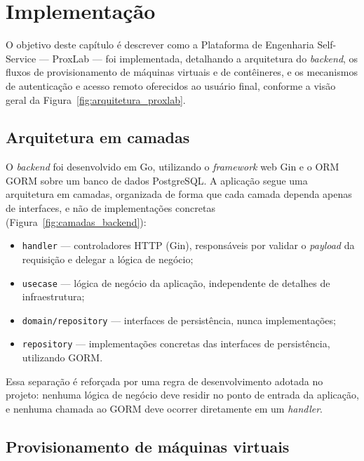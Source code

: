 \chapter{Implementação}
\label{chapter:implementacao}

O objetivo deste capítulo é descrever como a Plataforma de Engenharia Self-Service — ProxLab — foi implementada, detalhando a arquitetura do \textit{backend}, os fluxos de provisionamento de máquinas virtuais e de contêineres, e os mecanismos de autenticação e acesso remoto oferecidos ao usuário final, conforme a visão geral da Figura~\ref{fig:arquitetura_proxlab}.


\section{Arquitetura em camadas}

O \textit{backend} foi desenvolvido em Go, utilizando o \textit{framework} web Gin e o ORM GORM sobre um banco de dados PostgreSQL. A aplicação segue uma arquitetura em camadas, organizada de forma que cada camada dependa apenas de interfaces, e não de implementações concretas (Figura~\ref{fig:camadas_backend}):

\begin{itemize}
    \item \texttt{handler} — controladores HTTP (Gin), responsáveis por validar o \textit{payload} da requisição e delegar a lógica de negócio;
    \item \texttt{usecase} — lógica de negócio da aplicação, independente de detalhes de infraestrutura;
    \item \texttt{domain/repository} — interfaces de persistência, nunca implementações;
    \item \texttt{repository} — implementações concretas das interfaces de persistência, utilizando GORM.
\end{itemize}

Essa separação é reforçada por uma regra de desenvolvimento adotada no projeto: nenhuma lógica de negócio deve residir no ponto de entrada da aplicação, e nenhuma chamada ao GORM deve ocorrer diretamente em um \textit{handler}.


\section{Provisionamento de máquinas virtuais}


